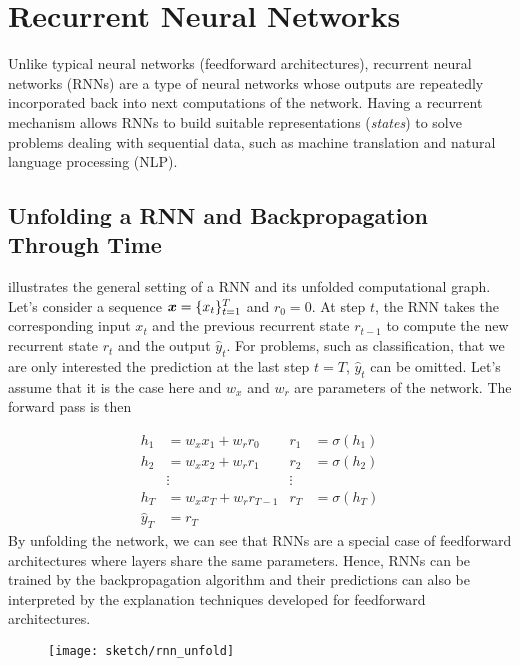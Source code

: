 \section{Recurrent Neural Networks}
Unlike typical neural networks (feedforward architectures), recurrent neural networks (RNNs) are a type of neural networks whose outputs are repeatedly incorporated back into next computations of the network. Having a recurrent mechanism allows RNNs to build suitable representations (\textit{states}) to solve problems dealing with sequential data,  such as machine translation and natural language processing (NLP).

\subsection{Unfolding a RNN and Backpropagation Through Time}
 
\addfigure{\ref{fig:rnn_unfold}} illustrates the general setting of a RNN and its unfolded computational graph. Let's consider a sequence $\boldsymbol{x}= \{ x_t \}_{t=1}^{T}$ and $r_0 = 0$.  At step $t$, the RNN takes  the corresponding input $x_{t}$ and the previous recurrent state $r_{t-1}$ to compute the new recurrent state $r_{t}$ and the output $\hat{y}_t$. For problems, such as classification, that we are only interested the prediction at the last step $t=T$, $\hat{y}_t$ can be omitted. Let's assume that it is the case here and $w_x$ and $w_r$ are parameters of the network.  The forward pass is then

\begin{align*}
	h_1 &= w_{x} x_1 + w_{r} r_0 & r_1 &= \sigma(h_1)  \\
	h_2 &= w_{x} x_2 + w_{r} r_1 &  r_2 &= \sigma(h_2) \\
	& \vdots & \vdots \\
	h_{T} &= w_{x} x_{T} + w_{r} r_{T-1} &  r_{T} &= \sigma(h_{T}) \\
	\hat{y}_T &= r_T
\end{align*}
By unfolding the network,  we can see that RNNs are a special case of feedforward architectures where layers share the same parameters. Hence, RNNs can be trained by the backpropagation algorithm and their predictions can also be interpreted by the explanation techniques developed for feedforward architectures.


\begin{figure}
\centering
\texttt{[image: sketch/rnn\_unfold]}
\label{fig:rnn_unfold} 
\end{figure}

